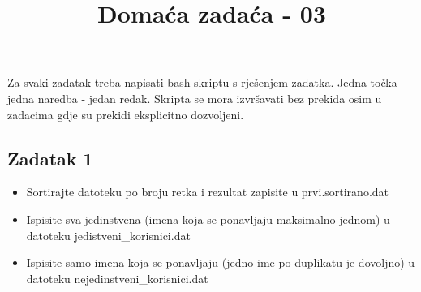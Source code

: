 \documentclass[12pt,a4paper]{article}
\begin{document}
  \title{Domaća zadaća - 03\vspace{-2em}}
  \maketitle
  Za svaki zadatak treba napisati bash skriptu s rješenjem zadatka. Jedna točka - jedna naredba - jedan redak. Skripta se mora izvršavati bez prekida osim u zadacima gdje su prekidi eksplicitno dozvoljeni.
  \subsection*{Zadatak 1}
  \begin{itemize}
      Napomena: Za sve tocke ovog zadatka iskoristite datoteku: prvi.dat. Datoteke koje nastaju kao proizvod 1. zadatka nije potrebno stavljati u git.
      Svaki redak u datoteci prvi.dat ima format <broj retka>:<ime>:<id korisnika>
    \item Sortirajte datoteku po broju retka i rezultat zapisite u prvi.sortirano.dat
    \item Ispisite sva jedinstvena (imena koja se ponavljaju maksimalno jednom) u datoteku jedistveni_korisnici.dat
    \item Ispisite samo imena koja se ponavljaju (jedno ime po duplikatu je dovoljno) u datoteku nejedinstveni_korisnici.dat
  \end{itemize}
\end{document}
